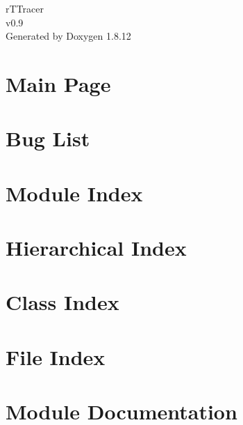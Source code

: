 \documentclass[twoside]{book}
\newcommand{\+}{\discretionary{\mbox{\scriptsize$\hookleftarrow$}}{}{}}
\newcommand{\clearemptydoublepage}{%
  \newpage{\pagestyle{empty}\cleardoublepage}%
}
\begin{document}
\hypersetup{pageanchor=false,
             bookmarksnumbered=true,
             pdfencoding=unicode
            }
\begin{titlepage}
\vspace*{7cm}
\begin{center}%
{\Large r\+T\+Tracer \\[1ex]\large v0.\+9 }\\
\vspace*{1cm}
{\large Generated by Doxygen 1.8.12}\\
\end{center}
\end{titlepage}
\clearemptydoublepage
{}
\tableofcontents
\clearemptydoublepage
{}
\hypersetup{pageanchor=true}

\chapter{Main Page}
\label{index}\hypertarget{index}{}
\chapter{Bug List}
\label{bug}
\hypertarget{bug}{}

\chapter{Module Index}

\chapter{Hierarchical Index}

\chapter{Class Index}

\chapter{File Index}

\chapter{Module Documentation}












\end{document}
